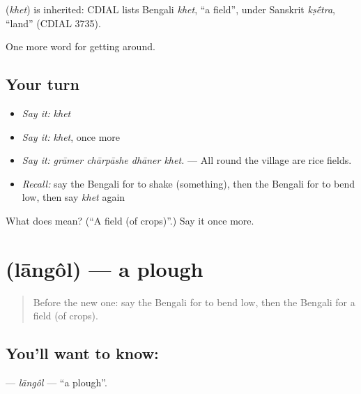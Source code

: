 \begin{cousinweb}
\textbf{} (\emph{khet}) is inherited: CDIAL lists Bengali \emph{khet}, \textquotedblleft{}a field\textquotedblright{}, under Sanskrit \emph{kṣ\'{\={e}}tra}, \textquotedblleft{}land\textquotedblright{} (CDIAL 3735).
\end{cousinweb}

\begin{grammarlens}[title={What you've built}]
One more word for getting around.
\end{grammarlens}

\subsection*{Your turn}
\begin{itemize}
\raggedright
  \item \emph{Say it:} \emph{khet}
  \item \emph{Say it:} \emph{khet}, once more
  \item \emph{Say it:} \emph{grāmer chārpāshe dhāner khet.} — All round the village are rice fields.
  \item \emph{Recall:} say the Bengali for to shake (something), then the Bengali for to bend low, then say \emph{khet} again
\end{itemize}

\begin{tcolorbox}[breakable,colback=teal!4,colframe=teal!35!black,title={Before you move on}]
What does  mean? (\textquotedblleft{}A field (of crops)\textquotedblright{}.) Say it once more.
\end{tcolorbox}
\section[\texorpdfstring{\bn{লাঙল} (lāngôl)}{লাঙল (lāngôl)}]{ (lāngôl) — a plough}

\label{lesson:BN-C430-langol}



\begin{quote}
Before the new one: say the Bengali for to bend low, then the Bengali for a field (of crops).
\end{quote}

\subsection*{You'll want to know: }
\textbf{} — \emph{lāngôl} — \textquotedblleft{}a plough\textquotedblright{}.

